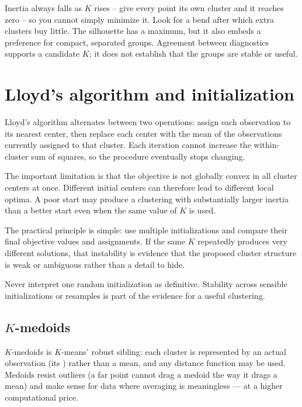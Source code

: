 \begin{intuition}
Inertia always falls as $K$ rises -- give every point its own cluster and it reaches zero -- so you cannot simply minimize it. Look for a bend after which extra clusters buy little. The silhouette has a maximum, but it also embeds a preference for compact, separated groups. Agreement between diagnostics supports a candidate $K$; it does not establish that the groups are stable or useful.
\end{intuition}

\section{Lloyd's algorithm and initialization}

Lloyd's algorithm alternates between two operations: assign each observation to its nearest center, then replace each center with the mean of the observations currently assigned to that cluster. Each iteration cannot increase the within-cluster sum of squares, so the procedure eventually stops changing.

The important limitation is that the objective is not globally convex in all cluster centers at once. Different initial centers can therefore lead to different local optima. A poor start may produce a clustering with substantially larger inertia than a better start even when the same value of $K$ is used.

The practical principle is simple: use multiple initializations and compare their final objective values and assignments. If the same $K$ repeatedly produces very different solutions, that instability is evidence that the proposed cluster structure is weak or ambiguous rather than a detail to hide.

\begin{keyidea}
Never interpret one random initialization as definitive. Stability across sensible initializations or resamples is part of the evidence for a useful clustering.
\end{keyidea}

\subsection{$K$-medoids}

$K$-medoids is $K$-means' robust sibling: each cluster is represented by an actual observation (its ) rather than a mean, and any distance function may be used. Medoids resist outliers (a far point cannot drag a medoid the way it drags a mean) and make sense for data where averaging is meaningless --- at a higher computational price.

